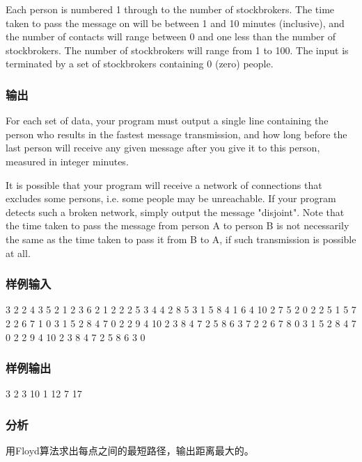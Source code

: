 Each person is numbered 1 through to the number of stockbrokers. The time taken to pass the message on will be between 1 and 10 minutes (inclusive), and the number of contacts will range between 0 and one less than the number of stockbrokers. The number of stockbrokers will range from 1 to 100. The input is terminated by a set of stockbrokers containing 0 (zero) people. 

\subsubsection{输出}
For each set of data, your program must output a single line containing the person who results in the fastest message transmission, and how long before the last person will receive any given message after you give it to this person, measured in integer minutes. 

It is possible that your program will receive a network of connections that excludes some persons, i.e. some people may be unreachable. If your program detects such a broken network, simply output the message "disjoint". Note that the time taken to pass the message from person A to person B is not necessarily the same as the time taken to pass it from B to A, if such transmission is possible at all.

\subsubsection{样例输入}
\begin{Code}
3
2 2 4 3 5
2 1 2 3 6
2 1 2 2 2
5
3 4 4 2 8 5 3
1 5 8
4 1 6 4 10 2 7 5 2
0
2 2 5 1 5
7        
2 2 6 7 1
0  
3 1 5 2 8 4 7
0
2 2 9 4 10
2 3 8 4 7
2 5 8 6 3
7        
2 2 6 7 8
0  
3 1 5 2 8 4 7
0
2 2 9 4 10
2 3 8 4 7
2 5 8 6 3
0
\end{Code}

\subsubsection{样例输出}
\begin{Code}
3 2  
3 10
1 12
7 17
\end{Code}

\subsubsection{分析}
用Floyd算法求出每点之间的最短路径，输出距离最大的。

